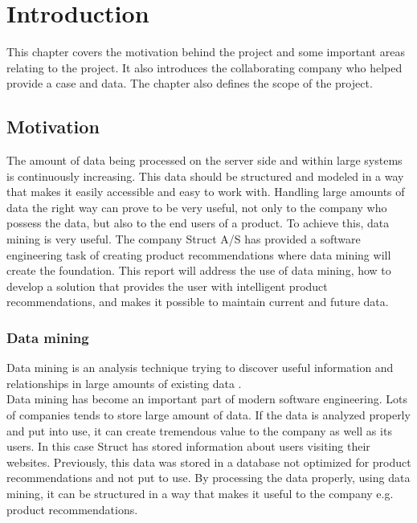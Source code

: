 
\chapter{Introduction} %

\label{ChapterX} %


This chapter covers the motivation behind the project and some important areas relating to the project. It also introduces the collaborating company who helped provide a case and data. The chapter also defines the scope of the project.

\section{Motivation}
The amount of data being processed on the server side and within large systems is continuously increasing. This data should be structured and modeled in a way that makes it easily accessible and easy to work with. Handling large amounts of data the right way can prove to be very useful, not only to the company who possess the data, but also to the end users of a product. To achieve this, data mining is very useful.
The company Struct A/S has provided a software engineering task of creating product recommendations where data mining will create the foundation. This report will address the use of data mining, how to develop a solution that provides the user with intelligent product recommendations, and makes it possible to maintain current and future data.

\subsection{Data mining}
Data mining is an analysis technique trying to discover useful information and relationships in large amounts of existing data \cite{dataminingSource}. \\  
Data mining has become an important part of modern software engineering. Lots of companies tends to store large amount of data. If the data is analyzed properly and put into use, it can create tremendous value to the company as well as its users. In this case Struct has stored information about users visiting their websites. Previously, this data was stored in a database not optimized for product recommendations and not put to use. By processing the data properly, using data mining, it can be structured in a way that makes it useful to the company e.g. product recommendations.

